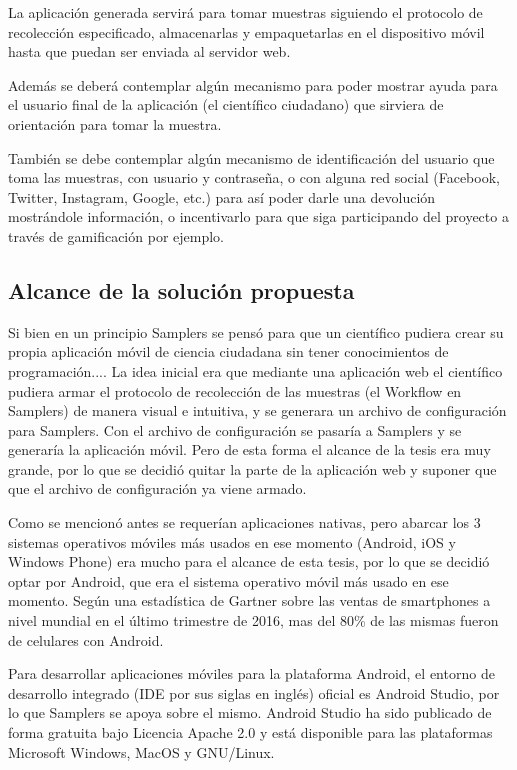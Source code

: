 La aplicación generada servirá para tomar muestras siguiendo el protocolo de recolección especificado, almacenarlas y empaquetarlas en el dispositivo móvil hasta que puedan ser enviada al servidor web.

Además se deberá contemplar algún mecanismo para poder mostrar ayuda para el usuario final de la aplicación (el científico ciudadano) que sirviera de orientación para tomar la muestra. 

También se debe contemplar algún mecanismo de identificación del usuario que toma las muestras, con usuario y contraseña, o con alguna red social (Facebook, Twitter, Instagram, Google, etc.) para así poder darle una devolución mostrándole información, o incentivarlo para que siga participando del proyecto a través de gamificación por ejemplo.



\subsection{Alcance de la solución propuesta}
Si bien en un principio Samplers se pensó para que un científico pudiera crear su propia aplicación móvil de ciencia ciudadana sin tener conocimientos de programación....
La idea inicial era que mediante una aplicación web el científico pudiera armar el protocolo de recolección de las muestras (el Workflow en Samplers) de manera visual e intuitiva, y se generara un archivo de configuración para Samplers. 
Con el archivo de configuración se pasaría a Samplers y se generaría la aplicación móvil. 
Pero de esta forma el alcance de la tesis era muy grande, por lo que se decidió quitar la parte de la aplicación web y suponer que que el archivo de configuración ya viene armado.

Como se mencionó antes se requerían aplicaciones nativas, pero abarcar los 3 sistemas operativos móviles más usados en ese momento (Android, iOS y Windows Phone) era mucho para el alcance de esta tesis, por lo que se decidió optar por Android, que era el sistema operativo móvil más usado en ese momento. Según una estadística de Gartner sobre las ventas de smartphones a nivel mundial en el último trimestre de 2016\cite{gartner}, mas del 80\% de las mismas fueron de celulares con Android. 

Para desarrollar aplicaciones móviles para la plataforma Android, el entorno de desarrollo integrado (IDE por sus siglas en inglés) oficial es Android Studio\cite{androidStudio}, por lo que Samplers se apoya sobre el mismo. Android Studio ha sido publicado de forma gratuita bajo Licencia Apache 2.0 y está disponible para las plataformas Microsoft Windows, MacOS y GNU/Linux.

